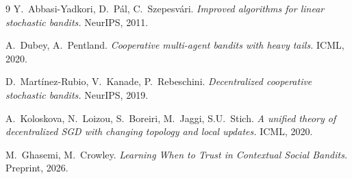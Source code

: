 \documentclass[11pt]{article}
\begin{document}
\begin{thebibliography}{9}
Y.~Abbasi-Yadkori, D.~P\'al, C.~Szepesv\'ari.
\textit{Improved algorithms for linear stochastic bandits.}
NeurIPS, 2011.

A.~Dubey, A.~Pentland.
\textit{Cooperative multi-agent bandits with heavy tails.}
ICML, 2020.

D.~Mart\'inez-Rubio, V.~Kanade, P.~Rebeschini.
\textit{Decentralized cooperative stochastic bandits.}
NeurIPS, 2019.

A.~Koloskova, N.~Loizou, S.~Boreiri, M.~Jaggi, S.U.~Stich.
\textit{A unified theory of decentralized SGD with changing topology
and local updates.}
ICML, 2020.

M.~Ghasemi, M.~Crowley.
\textit{Learning When to Trust in Contextual Social Bandits.}
Preprint, 2026.
\end{thebibliography}
\end{document}
